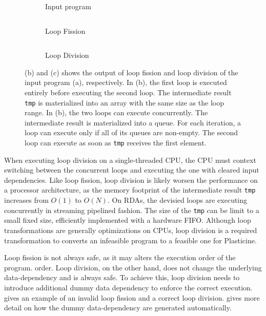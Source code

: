 \begin{figure}
\centering
\begin{subfigure}[b]{0.28\textwidth}
\inputminted{python}{code/loopexp1.py}
\caption{Input program}
\end{subfigure}
\hfill
\begin{subfigure}[b]{0.31\textwidth}
\inputminted{python}{code/loopexp1fission.py}
\caption{Loop Fission}
\end{subfigure}
\hfill
\begin{subfigure}[b]{0.32\textwidth}
\inputminted{python}{code/loopexp1division.py}
\caption{Loop Division}
\end{subfigure}
\caption[Example of Loop Fission vs. Loop Division]{
  (b) and (c) shows the output of loop fission and loop division of the input program (a), respectively.
  In (b), the first loop is executed entirely before executing the second loop. The intermediate
  result \texttt{tmp} is materialized into an array with the same size as the loop range.
  In (b), the two loops can execute concurrently. The intermediate result is materialized into a
  queue. For each iteration, a loop can execute only if all of its queues are non-empty.
  The second loop can execute as soon as \texttt{tmp} receives the first element.
}
\label{fig:loopexp1}
\end{figure}

When executing loop division on a single-threaded CPU, the CPU must context switching between the
concurrent loops
and executing the one with cleared input dependencies.
Like loop fission, loop division is likely worsen the performance on a processor architecture, as
the memory footprint of the intermediate result \texttt{tmp} increases from $O(1)$ to $O(N)$.
On RDAs, the devisied loops are executing
concurrently in streaming pipelined fashion. The size of the \texttt{tmp} can be limit to a small fixed
size, efficiently implemented with a hardware FIFO. 
Although loop transformations are generally optimizations on CPUs,
loop division is a required transformation to converts an infeasible program to a feasible one for Plasticine.

Loop fission is not always safe, as it may alters the execution order of the program.
order.
Loop division, on the other hand, does not change the underlying data-dependency and is always safe.
To achieve this, loop division needs to introduce additional dummy data dependency to enforce the correct 
execution.
 gives an example of an invalid loop fission and a correct loop division.
 gives more detail on how the dummy data-dependency are generated automatically.

